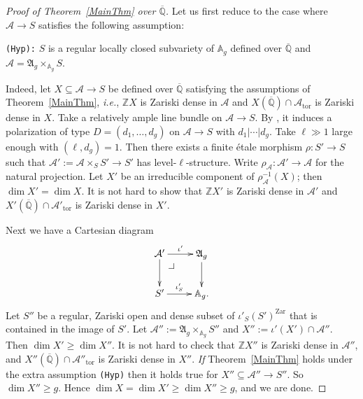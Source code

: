 \documentclass[12pt,oneside]{amsart}
\makeatletter
\numberwithin{maincounter}{section}
\numberwithin{equation}{section}
\def\QQ{\mathbb{Q}}
\newcommand{\cal}{\mathcal}
\newcommand{\cA}{\cal{A}}
\newcommand{\IQbar}{{\overline{\QQ}}}
\newcommand{\pullbackcorner}[1][dr]{\save*!/#1-1.7pc/#1:(-1.5,1.5)@^{|-}\restore}
\makeatother
\begin{document}
\begin{proof}[Proof of Theorem~\ref{MainThm} over $\IQbar$]
Let us first reduce to the case where $\cA \rightarrow S$ satisfies the following assumption:
\begin{center}
  {\tt (Hyp):} $S$ is a regular locally closed subvariety of $\mathbb{A}_g$ defined over $\IQbar$ and $\cA = \mathfrak{A}_g \times_{\mathbb{A}_g} S$.
\end{center}
Indeed, let $X \subseteq \cA \rightarrow S$ be defined over $\IQbar$ satisfying the assumptions of Theorem~\ref{MainThm}, \textit{i.e.}, %
$\mathbb{Z}X$ is Zariski dense in $\cA$ and $X(\IQbar) \cap \cA_{\mathrm{tor}}$ is Zariski dense in $X$. Take a relatively ample line bundle on $\cA \rightarrow S$. By \cite[$\mathsection$2.1]{GenestierNgo}, it induces a polarization of type $D = (d_1,\ldots,d_g)$ on $\cA\rightarrow S$ with $d_1|\cdots|d_g$. Take $\ell \gg 1$ large enough with $(\ell, d_g) = 1$. Then there exists a finite \'{e}tale morphism $\rho \colon S' \rightarrow S$ such that $\cA' := \cA\times_S S' \rightarrow S'$ has level-$\ell$-structure. Write $\rho_{\cA} \colon \cA' \rightarrow \cA$ for the natural projection. Let $X'$ be an irreducible component of $\rho_{\cA}^{-1}(X)$; then $\dim X' = \dim X$. It is not hard to show that 
$\mathbb{Z}X'$ is Zariski dense in $\cA'$ and $X'(\IQbar) \cap \cA'_{\mathrm{tor}}$ is Zariski dense in $X'$. %

Next we have a Cartesian diagram
\[
\xymatrix{
\cA' \ar[r]^-{\iota'} \ar[d] \pullbackcorner & \mathfrak{A}_g \ar[d] \\
S' \ar[r]^-{\iota'_S} & \mathbb{A}_g.
}
\]
Let $S''$ be a regular, Zariski open and dense subset of
$\iota'_S(S')^{\mathrm{Zar}}$ that is contained in the image of $S'$.
Let $\cA'' := \mathfrak{A}_g \times_{\mathbb{A}_g} S''$ and $X'' := \iota'(X') \cap \cA''$. Then $\dim X' \ge \dim X''$. It is not hard to check that 
$\mathbb{Z}X''$ is Zariski dense in $\cA''$, and $X''(\IQbar) \cap
\cA''_{\mathrm{tor}}$ is Zariski dense in $X''$. \textit{If}
Theorem~\ref{MainThm} holds under the extra assumption {\tt (Hyp)}
then  it holds true for $X'' \subseteq \cA'' \rightarrow S''$. So $\dim X'' \ge g$. Hence $\dim X = \dim X' \ge \dim X'' \ge g$, and we are done.


\end{proof}
\end{document}
